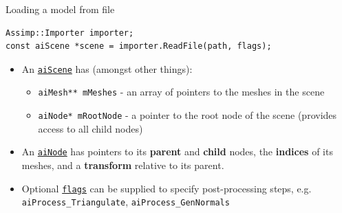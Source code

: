 \begin{frame}[fragile]{Loading a model from file}
		\begin{lstlisting}
Assimp::Importer importer;
const aiScene *scene = importer.ReadFile(path, flags); 
		\end{lstlisting}
		\begin{itemize}
		\pause\item An \href{http://assimp.sourceforge.net/lib_html/structai_scene.html}{\color{cyan}\lstinline{aiScene}} has (amongst other things):
		\begin{itemize}
			\pause\item \lstinline{aiMesh** mMeshes} - an array of pointers to the meshes in the scene
			\pause\item \lstinline{aiNode* mRootNode} - a pointer to the root node of the scene (provides access to all child nodes)
		\end{itemize}
		\pause\item An \href{http://assimp.sourceforge.net/lib_html/structai_node.html}{\color{cyan}\lstinline{aiNode}} has pointers to its \textbf{parent} and \textbf{child} nodes, the \textbf{indices} of its meshes, and a \textbf{transform} relative to its parent.
		\pause\item Optional \href{http://assimp.sourceforge.net/lib_html/postprocess_8h.html#a64795260b95f5a4b3f3dc1be4f52e410}{\color{cyan}\lstinline{flags}} can be supplied to specify post-processing steps, e.g. \lstinline{aiProcess_Triangulate}, \lstinline{aiProcess_GenNormals}
	\end{itemize} 
\end{frame}